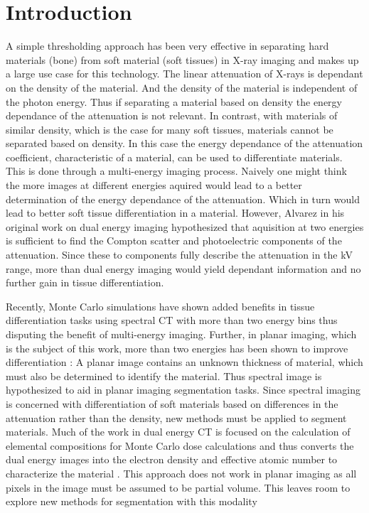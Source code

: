 \documentclass[a4paper,11pt]{article}
\begin{document}
\section{Introduction}


A simple thresholding approach has been very effective in separating hard materials (bone) from soft material (soft tissues) in X-ray imaging and makes up a large use case for this technology. The linear attenuation of X-rays is dependant on the density of the material. And the density of the material is independent of the photon energy. Thus if separating a material based on density the energy dependance of the attenuation is not relevant. In contrast, with materials of similar density, which is the case for many soft tissues, materials cannot be separated based on density. In this case the energy dependance of the attenuation coefficient, characteristic of a material, can be used to differentiate materials. This is done through a multi-energy imaging process\cite{Alvarez1976Energy}. Naively one might think the more images at different energies aquired would lead to a better determination of the energy dependance of the attenuation. Which in turn would lead to better soft tissue differentiation in a material. However, Alvarez in his original work on dual energy imaging hypothesized that aquisition at two energies is sufficient to find the Compton scatter and photoelectric components of the attenuation. Since these to components fully describe the attenuation in the kV range, more than dual energy imaging would yield dependant information and no further gain in tissue differentiation.

Recently, Monte Carlo simulations have shown added benefits in tissue differentiation tasks using spectral CT with more than two energy bins \cite{Lalonde2016ACT} thus disputing the benefit of multi-energy imaging. Further, in planar imaging, which is the subject of this work, more than two energies has been shown to improve differentiation \cite{OConnell}: A planar image contains an unknown thickness of material, which must also be determined to identify the material. Thus spectral image is hypothesized to aid in planar imaging segmentation tasks. Since spectral imaging is concerned with differentiation of soft materials based on differences in the attenuation rather than the density, new methods must be applied to segment materials. Much of the work in dual energy CT is focused on the calculation of elemental compositions for Monte Carlo dose calculations and thus converts the dual energy images into the electron density and effective atomic number to characterize the material \cite{Bazalova}. This approach does not work in planar imaging as all pixels in the image must be assumed to be partial volume. This leaves room to explore new methods for segmentation with this modality
\end{document}
